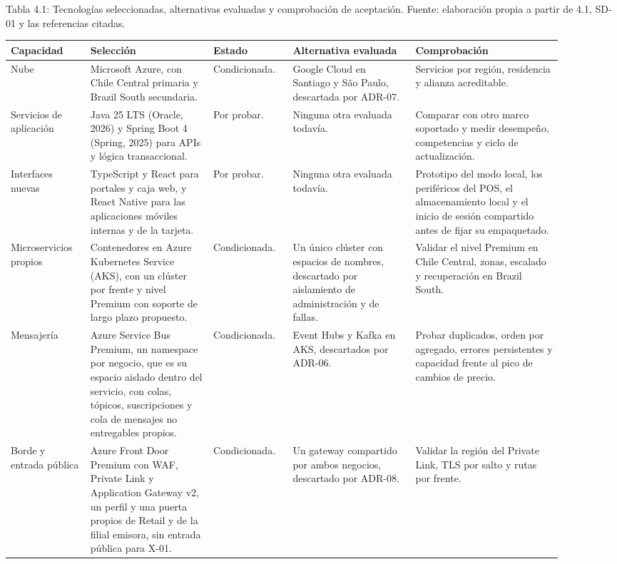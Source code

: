 \documentclass[11pt]{article}
\begin{document}
Tabla 4.1: Tecnologías seleccionadas, alternativas evaluadas y comprobación de aceptación. Fuente: elaboración propia a partir de 4.1, SD-01 y las referencias citadas.\par\nopagebreak
\begin{longtable}{@{}p{0.135\linewidth}p{0.2\linewidth}p{0.12\linewidth}p{0.2\linewidth}p{0.245\linewidth}@{}}
\toprule Capacidad & Selección & Estado & Alternativa evaluada & Comprobación \\
\midrule\endhead\bottomrule\endlastfoot
Nube & Microsoft Azure, con Chile Central primaria y Brazil South secundaria. & Condicionada. & Google Cloud en Santiago y São Paulo, descartada por ADR-07. & Servicios por región, residencia y alianza acreditable. \\
Servicios de aplicación & Java 25 LTS (Oracle, 2026) y Spring Boot 4 (Spring, 2025) para APIs y lógica transaccional. & Por probar. & Ninguna otra evaluada todavía. & Comparar con otro marco soportado y medir desempeño, competencias y ciclo de actualización. \\
Interfaces nuevas & TypeScript y React para portales y caja web, y React Native para las aplicaciones móviles internas y de la tarjeta. & Por probar. & Ninguna otra evaluada todavía. & Prototipo del modo local, los periféricos del POS, el almacenamiento local y el inicio de sesión compartido antes de fijar su empaquetado. \\
Microservicios propios & Contenedores en Azure Kubernetes Service (AKS), con un clúster por frente y nivel Premium con soporte de largo plazo propuesto. & Condicionada. & Un único clúster con espacios de nombres, descartado por aislamiento de administración y de fallas. & Validar el nivel Premium en Chile Central, zonas, escalado y recuperación en Brazil South. \\
Mensajería & Azure Service Bus Premium, un namespace por negocio, que es su espacio aislado dentro del servicio, con colas, tópicos, suscripciones y cola de mensajes no entregables propios. & Condicionada. & Event Hubs y Kafka en AKS, descartados por ADR-06. & Probar duplicados, orden por agregado, errores persistentes y capacidad frente al pico de cambios de precio. \\
Borde y entrada pública & Azure Front Door Premium con WAF, Private Link y Application Gateway v2, un perfil y una puerta propios de Retail y de la filial emisora, sin entrada pública para X-01. & Condicionada. & Un gateway compartido por ambos negocios, descartado por ADR-08. & Validar la región del Private Link, TLS por salto y rutas por frente. \\

\end{longtable}
\end{document}
